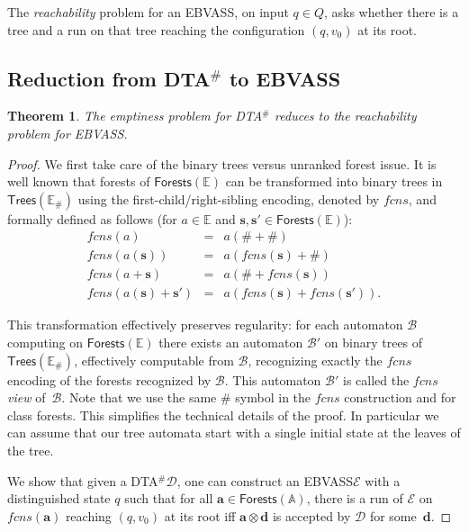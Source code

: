 \documentclass{CSML}
\newtheorem{theorem}{Theorem}
\newcommand\ebvass{\textup{EBVASS}\xspace}
\newcommand\dad{\textup{DTA}$^\#$\xspace}
\newcommand\A{\ensuremath{\mathbb{A}}\xspace}
\newcommand\E{\mathbb{E}}
\newcommand\Ba{\mathcal{B}}
\newcommand\Da{\mathcal{D}}
\newcommand\Ea{\mathcal{E}}
\newcommand\Trees{\mathsf{Trees}}
\newcommand\Forests{\mathsf{Forests}}
\newcommand\atree{\boldsymbol{a}}
\newcommand\dtree{\boldsymbol{d}}
\newcommand\stree{\boldsymbol{s}}
\newcommand\fcns{\ensuremath{\mathit{fcns}}\xspace}
\begin{document}
\medskip

\noindent
The \emph{reachability} problem for an \ebvass, on input $q\in Q$, 
asks whether there is a tree and a run on that tree reaching 
the configuration $(q,v_0)$ at its root.


\subsection{Reduction from \texorpdfstring{\dad}{DTA} to \texorpdfstring{\ebvass}{EBVASS}}

\begin{theorem}\label{prop-reduct}
  The emptiness problem for \dad reduces to the reachability problem for
  \ebvass.
\end{theorem}
\begin{proof}
We first take care of the binary trees versus unranked forest issue.
It is well known that forests of $\Forests(\E)$
can be transformed into binary trees in $\Trees(\E_\#)$ 
using the first-child/right-sibling encoding, denoted by $\fcns$,
and formally defined as follows (for $a \in \E$ and $\stree, \stree' \in \Forests(\E)$):
\[
\begin{array}{rcl}
\fcns(a) & = & a(\# + \#)\\
\fcns(a(\stree)) & = & a( \fcns(\stree) + \#)\\
\fcns(a + \stree) & = & a(\# + \fcns(\stree))\\
\fcns(a(\stree) + \stree') & = & a( \fcns(\stree) + \fcns(\stree')).
\end{array}
\]


This transformation effectively preserves regularity: 
for each automaton $\Ba$ computing on $\Forests(\E)$ 
there exists an automaton $\Ba'$ on binary trees of $\Trees(\E_\#)$,
effectively computable from $\Ba$, 
recognizing exactly the $\fcns$ encoding of the forests recognized by $\Ba$.  
This automaton $\Ba'$ is called the $\fcns$ \emph{view} of~$\Ba$.  
Note that we use the same $\#$ symbol in the \fcns construction and 
for class forests. This simplifies the technical details of the proof. In
particular we can assume that our tree automata start with a single initial
state at the leaves of the tree.


\medskip

  We show that given a \dad $\Da$, one can construct an \ebvass $\Ea$ with a
  distinguished state $q$ such that for all $\atree \in \Forests(\A)$, there is
  a run of $\Ea$ on $\fcns(\atree)$ reaching $(q, v_0)$ at its root iff
  $\atree\otimes\dtree$ is accepted by $\Da$ for some~$\dtree$.


\end{proof}
\end{document}
